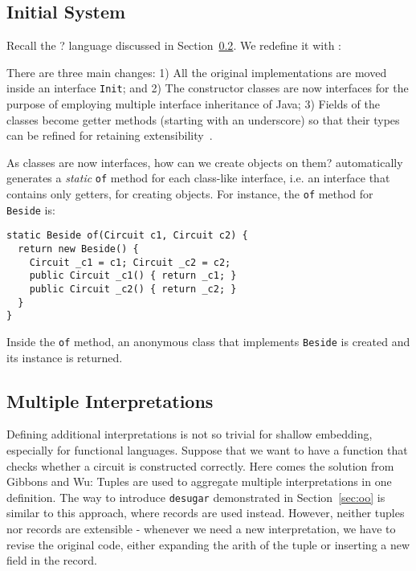 \subsection{Initial System}
Recall the ? language discussed in Section~\ref{}.
We redefine it with \name:


There are three main changes:
1) All the original implementations are moved inside an interface \texttt{Init}; and
2) The constructor classes are now interfaces for the purpose of employing
multiple interface inheritance of Java;
3) Fields of the classes become getter methods (starting with an underscore) so that their types can be refined for retaining extensibility~\cite{eptrivially16}.

As classes are now interfaces, how can we create objects on them?
\name automatically generates a \emph{static} \texttt{of} method for each
class-like interface, i.e. an interface that contains only getters, for creating objects.
For instance, the \texttt{of} method for \texttt{Beside} is:
\begin{lstlisting}
static Beside of(Circuit c1, Circuit c2) {
  return new Beside() {
    Circuit _c1 = c1; Circuit _c2 = c2;
    public Circuit _c1() { return _c1; }
    public Circuit _c2() { return _c2; }
  }
}
\end{lstlisting}
Inside the \texttt{of} method, an anonymous class that implements
\texttt{Beside} is created and its instance is returned.

\subsection{Multiple Interpretations}
Defining additional interpretations is not so trivial for shallow embedding,
especially for functional languages.
Suppose that we want to have a function that checks whether a circuit is constructed correctly. Here comes the solution from Gibbons and Wu:
Tuples are used to aggregate multiple interpretations in one definition.
The way to introduce \texttt{desugar} demonstrated in Section~\ref{sec:oo} is similar to this
approach, where records are used instead.
However, neither tuples nor records are extensible - whenever we need a new
interpretation, we have to revise the original code, either expanding the arith of the
tuple or inserting a new field in the record.

